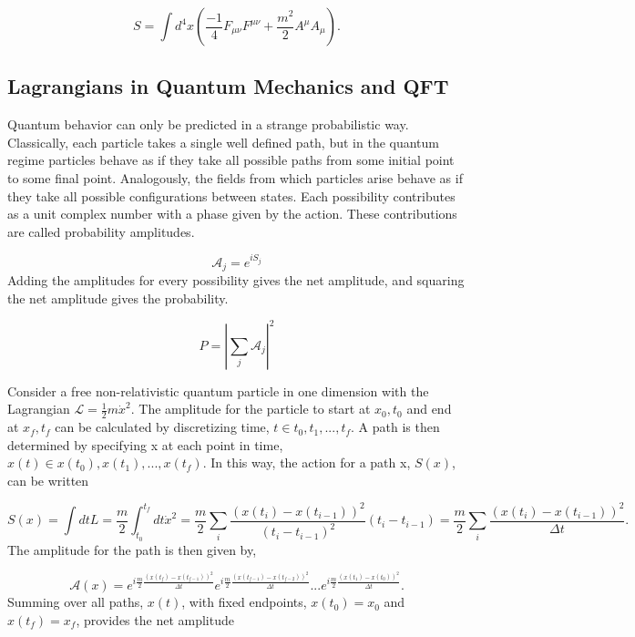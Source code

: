 \begin{equation}
S = \int d^4x \left( \frac{-1}{4}F_{\mu\nu}F^{\mu\nu}  + \frac{m^2}{2} A^\mu A_\mu \right).
\end{equation}

\subsection{Lagrangians in Quantum Mechanics and QFT}

Quantum behavior can only be predicted in a strange probabilistic way. Classically, each particle takes a single well defined path, but in the quantum regime particles behave as if they take all possible paths from some initial point to some final point. Analogously, the fields from which particles arise behave as if they take all possible configurations between states. Each possibility contributes as a unit complex number with a phase given by the action. These contributions are called probability amplitudes. 

\begin{equation}
\mathcal{A}_j = e^{iS_{j}} 
\end{equation}
Adding the amplitudes for every possibility gives the net amplitude, and squaring the net amplitude gives the probability.   

\begin{equation}
P = |\sum_j \mathcal{A}_j|^2
\end{equation}

Consider a free non-relativistic quantum particle in one dimension with the Lagrangian $\mathcal{L} = \frac{1}{2}m\dot{x}^2$. The amplitude for the particle to start at $x_0, t_0$ and end at $x_f, t_f$ can be calculated by discretizing time, $t \in {t_0, t_1, ..., t_f}$. A path is then determined by specifying x at each point in time, $x(t) \in {x(t_0), x(t_1), ..., x(t_f)}$. In this way, the action for a path x, $S(x)$, can be written

\begin{equation}
S(x) = \int dt L = \frac{m}{2} \int_{t_0}^{t_f} dt \dot{x}^2 = \frac{m}{2} \sum_i \frac{(x(t_i) - x(t_{i-1}))^2}{(t_i - t_{i-1})^2} (t_i - t_{i-1})  
= \frac{m}{2} \sum_i \frac{(x(t_i) - x(t_{i-1}))^2}{\Delta t}.
\end{equation}
The amplitude for the path is then given by, 

\begin{equation}
\mathcal{A}(x) = e^{i\frac{m}{2}\frac{(x(t_f) - x(t_{f-1}))^2}{\Delta t}}e^{i\frac{m}{2}\frac{(x(t_{f-1}) - x(t_{f-2}))^2}{\Delta t}}...e^{i\frac{m}{2}\frac{(x(t_1) - x(t_{0}))^2}{\Delta t}}.
\end{equation}
Summing over all paths, $x(t)$, with fixed endpoints, $x(t_0) = x_0$ and $x(t_f) = x_f$, provides the net amplitude 

